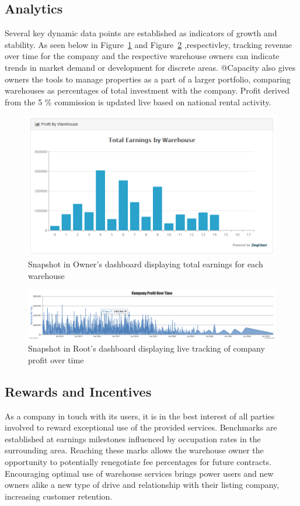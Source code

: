\subsection{Analytics}

Several key dynamic data points are established as indicators of growth and stability. As seen below in Figure~\ref{fig:ownergraph} and Figure~\ref{fig:profit} ,respectivley, tracking revenue over time for the company and the respective warehouse owners can indicate trends in market demand or development for discrete areas. @Capacity also gives owners the tools to manage properties as a part of a larger portfolio, comparing warehouses as percentages of total investment with the company. Profit derived from the 5 \% commission is updated live based on national rental activity.
\begin{figure}[H]
\centering
\includegraphics[width=1\textwidth]{Phase_3/earninggraph}
\caption{Snapshot in Owner's dashboard displaying total earnings for each warehouse}
\label{fig:ownergraph}
\end{figure}

\begin{figure}[H]
\centering
\includegraphics[width=1\textwidth]{Phase_3/Profit}
\caption{Snapshot in Root's dashboard displaying live tracking of company profit over time}
\label{fig:profit}
\end{figure}


\subsection{Rewards and Incentives}
As a company in touch with its users, it is in the best interest of all parties involved to reward exceptional use of the provided services. Benchmarks are established at earnings milestones influenced by occupation rates in the surrounding area. Reaching these marks allows the warehouse owner the opportunity to potentially renegotiate fee percentages for future contracts. Encouraging optimal use of warehouse services brings power users and new owners alike a new type of drive and relationship with their listing company, increasing customer retention. 



